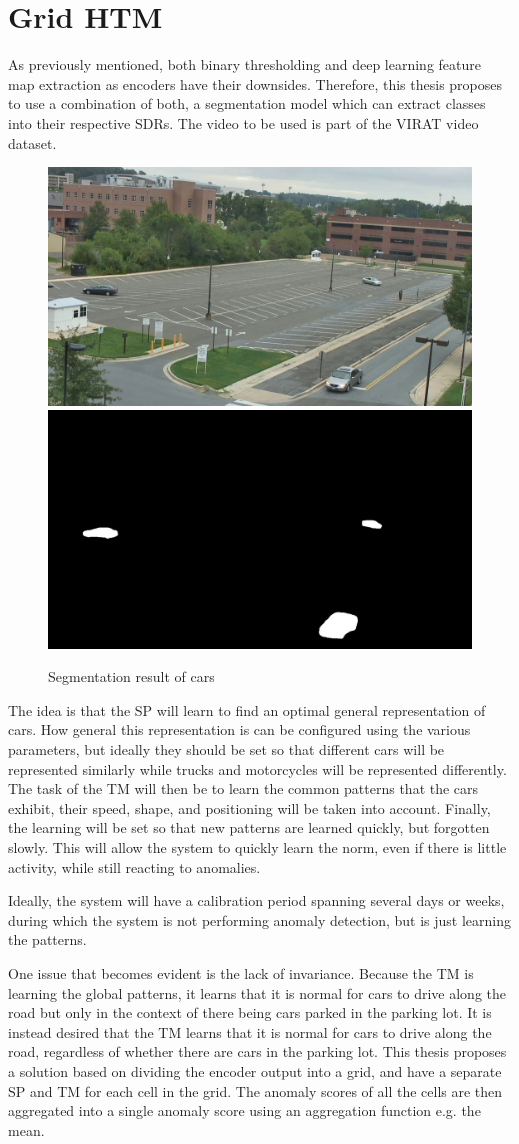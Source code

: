 \chapter{Grid HTM}
As previously mentioned, both binary thresholding and deep learning feature map extraction as encoders have their downsides. Therefore, this thesis proposes to use a combination of both, a segmentation model which can extract classes into their respective SDRs. The video to be used is part of the VIRAT\cite{VIRAT} video dataset.
\begin{figure}[H]
    \centering
    \includegraphics[width=.45\textwidth]{resources/methodology/original.png}\hfill
    \includegraphics[width=.45\textwidth]{resources/methodology/car_segmentation.png}
    \caption{Segmentation result of cars}
    \label{fig:figure3}
\end{figure}
The idea is that the SP will learn to find an optimal general representation of cars. How general this representation is can be configured using the various parameters, but ideally they should be set so that different cars will be represented similarly while trucks and motorcycles will be represented differently. The task of the TM will then be to learn the common patterns that the cars exhibit, their speed, shape, and positioning will be taken into account. Finally, the learning will be set so that new patterns are learned quickly, but forgotten slowly. This will allow the system to quickly learn the norm, even if there is little activity, while still reacting to anomalies. \par
Ideally, the system will have a calibration period spanning several days or weeks, during which the system is not performing anomaly detection, but is just learning the patterns.\par
One issue that becomes evident is the lack of invariance. Because the TM is learning the global patterns, it learns that it is normal for cars to drive along the road but only in the context of there being cars parked in the parking lot. It is instead desired that the TM learns that it is normal for cars to drive along the road, regardless of whether there are cars in the parking lot. This thesis proposes a solution based on dividing the encoder output into a grid, and have a separate SP and TM for each cell in the grid. The anomaly scores of all the cells are then aggregated into a single anomaly score using an aggregation function e.g. the mean.
